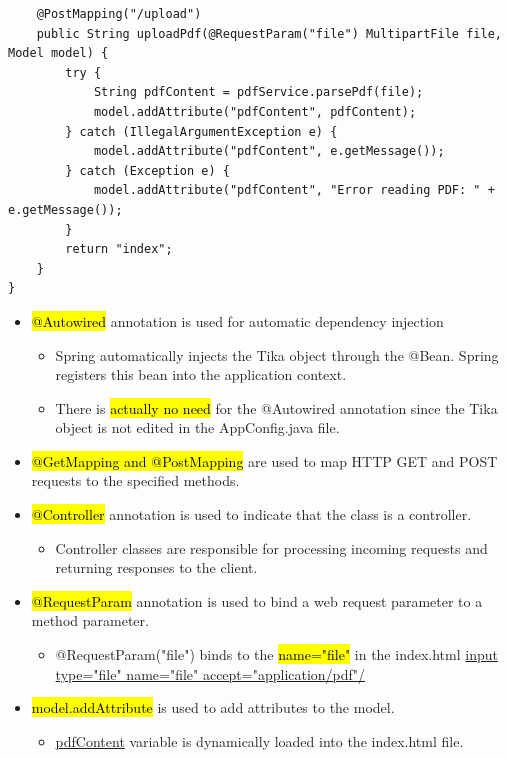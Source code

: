 \documentclass[10pt, landscape]{article}
\newcommand{\hlred}[1]{{\sethlcolor{myred}\hl{#1}}}
\begin{document}
\begin{multicols*}{2}
\begin{verbatim}
    @PostMapping("/upload")
    public String uploadPdf(@RequestParam("file") MultipartFile file, Model model) {
        try {
            String pdfContent = pdfService.parsePdf(file);
            model.addAttribute("pdfContent", pdfContent);
        } catch (IllegalArgumentException e) {
            model.addAttribute("pdfContent", e.getMessage());
        } catch (Exception e) {
            model.addAttribute("pdfContent", "Error reading PDF: " + e.getMessage());
        }
        return "index";
    }
}
\end{verbatim}
    \begin{itemize}
        \item \hl{@Autowired} annotation is used for automatic dependency injection
              \begin{itemize}
                  \item Spring automatically injects the Tika object through the @Bean. Spring registers this bean into the application context.
                  \item There is \hlred{actually no need} for the @Autowired annotation since the Tika object is not edited in the AppConfig.java file.
              \end{itemize}
        \item \hl{@GetMapping and @PostMapping} are used to map HTTP GET and POST requests to the specified methods.
        \item \hl{@Controller} annotation is used to indicate that the class is a controller.
              \begin{itemize}
                  \item Controller classes are responsible for processing incoming requests and returning responses to the client.
              \end{itemize}
        \item \hl{@RequestParam} annotation is used to bind a web request parameter to a method parameter.
              \begin{itemize}
                  \item @RequestParam("file") binds to the \hl{name="file"} in the index.html \underline{
                            input type="file" name="file" accept="application/pdf"/}
              \end{itemize}
        \item \hl{model.addAttribute} is used to add attributes to the model.
              \begin{itemize}
                  \item \underline{pdfContent} variable is dynamically loaded into the index.html file.

\end{itemize}
\end{itemize}
\end{multicols*}
\end{document}
